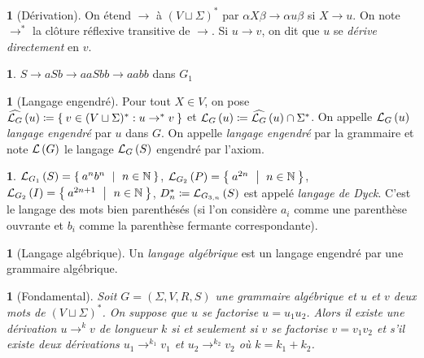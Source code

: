 \documentclass[11pt,a4paper]{article}
\theoremstyle{plain}
\theoremstyle{definition}
\newtheorem{defn}[thm]{\protect\definitionname}
\theoremstyle{definition}
\newtheorem{example}[thm]{\protect\examplename}
\theoremstyle{remark}
\theoremstyle{remark}
\theoremstyle{plain}
\newtheorem{lem}[thm]{\protect\lemmaname}
\theoremstyle{plain}
\theoremstyle{plain}
\theoremstyle{remark}
\providecommand{\definitionname}{Définition}
\providecommand{\examplename}{Exemple}
\providecommand{\lemmaname}{Lemme}
\begin{document}
\begin{defn}[Dérivation]
	On étend $\to$ à $(V\sqcup\Sigma)^*$ par $\alpha X \beta \to \alpha u \beta$ si $X\to u$. On note $\to^*$ la clôture réflexive transitive de $\to$. Si $u\to v$, on dit que $u$ se \emph{dérive directement} en $v$.
\end{defn}

\begin{example}
	$S\to aSb\to aaSbb\to aabb$ dans $G_{1}$
\end{example}

\begin{defn}[Langage engendré]
	Pour tout $X\in V$, on pose $\widehat{\mathcal{L}_{G}}\left(u\right)\coloneqq \Set{v\in (V\sqcup\Sigma)^*:u\to^* v}$ et $\mathcal{L}_{G}\left(u\right)\coloneqq \widehat{\mathcal{L}_{G}}\left(u\right)\cap \Sigma^*$. On appelle $\mathcal{L}_{G}\left(u\right)$ \emph{langage engendré} par $u$ dans $G$. On appelle \emph{langage engendré} par la grammaire et note $\mathcal{L}\left(G\right)$ le langage $\mathcal{L}_{G}\left(S\right)$ engendré par l'axiom.
\end{defn}

\begin{example}
	$\L_{G_{1}}\left(S\right)=\Set{a^{n}b^{n}\ |\ n\in\N}$, $\L_{G_{2}}\left(P\right)=\Set{a^{2n}\ |\ n\in\N}$,
	$\L_{G_{2}}\left(I\right)=\Set{a^{2n+1}\ |\ n\in\N}$, $D_{n}^{*}\coloneqq\mathcal{L}_{G_{3,n}}\left(S\right)$
	est appelé \emph{langage de Dyck}\label{dyck}. C'est le langage des mots bien parenthésés
	(si l'on considère $a_{i}$ comme une parenthèse ouvrante et $b_{i}$
	comme la parenthèse fermante correspondante).
\end{example}

\begin{defn}[Langage algébrique]
	Un \emph{langage algébrique} est un langage engendré par une grammaire algébrique.
\end{defn}

\begin{lem}[Fondamental]
	Soit $G=(\Sigma,V,R,S)$ une grammaire algébrique et $u$ et $v$ deux mots de $(V\sqcup \Sigma)^*$. On suppose que $u$ se factorise $u=u_1u_2$. Alors il existe une dérivation $u\to^k v$ de longueur $k$ si et seulement si $v$ se factorise $v=v_1v_2$ et s'il existe deux dérivations $u_1\to^{k_1}v_1$ et $u_2\to^{k_2}v_2$ où $k=k_1+k_2$.
\end{lem}



\end{document}
